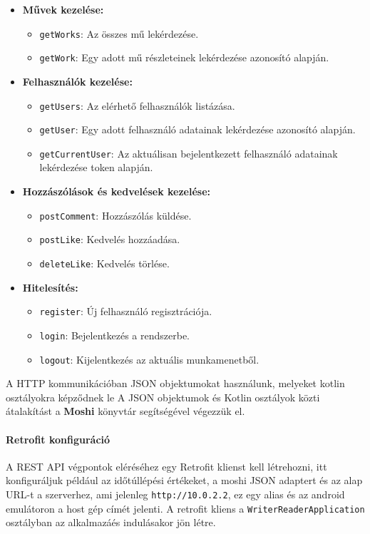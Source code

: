 \begin{itemize}
    \item \textbf{Művek kezelése:}
    \begin{itemize}
        \item \texttt{getWorks}: Az összes mű lekérdezése.
        \item \texttt{getWork}: Egy adott mű részleteinek lekérdezése azonosító alapján.
    \end{itemize}
    \item \textbf{Felhasználók kezelése:}
    \begin{itemize}
        \item \texttt{getUsers}: Az elérhető felhasználók listázása.
        \item \texttt{getUser}: Egy adott felhasználó adatainak lekérdezése azonosító alapján.
        \item \texttt{getCurrentUser}: Az aktuálisan bejelentkezett felhasználó adatainak lekérdezése token alapján.
    \end{itemize}
    \item \textbf{Hozzászólások és kedvelések kezelése:}
    \begin{itemize}
        \item \texttt{postComment}: Hozzászólás küldése.
        \item \texttt{postLike}: Kedvelés hozzáadása.
        \item \texttt{deleteLike}: Kedvelés törlése.
    \end{itemize}
    \item \textbf{Hitelesítés:}
    \begin{itemize}
        \item \texttt{register}: Új felhasználó regisztrációja.
        \item \texttt{login}: Bejelentkezés a rendszerbe.
        \item \texttt{logout}: Kijelentkezés az aktuális munkamenetből.
    \end{itemize}
\end{itemize}

A HTTP kommunikációban JSON objektumokat használunk, melyeket kotlin osztályokra képződnek le
A JSON objektumok és Kotlin osztályok közti átalakítást a \textbf{Moshi} könyvtár segítségével végezzük el. 

\paragraph{Retrofit konfiguráció}
A REST API végpontok eléréséhez egy Retrofit klienst kell létrehozni, itt konfiguráljuk például az időtúllépési értékeket, a moshi JSON adaptert
és az alap URL-t a szerverhez, ami jelenleg \texttt{http://10.0.2.2}, ez egy alias és az android emulátoron a host gép címét jelenti.
A retrofit kliens a \texttt{WriterReaderApplication} osztályban az alkalmazáés indulásakor jön létre.

